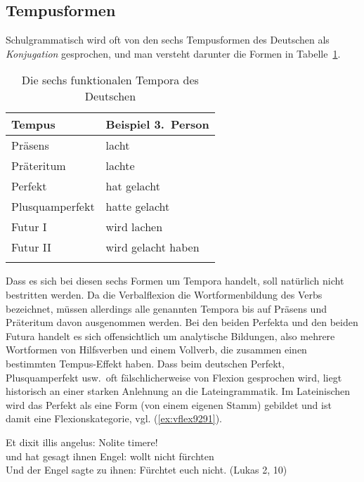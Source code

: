 \subsection{Tempusformen}

\label{sec:deutemp}

Schulgrammatisch wird oft von den sechs Tempusformen des Deutschen als \textit{Konjugation} gesprochen, und man versteht darunter \idR die Formen in Tabelle~\ref{tab:sechstempora}.

\begin{table}
  \centering
  \begin{tabular}{ll}
    \lsptoprule
    \textbf{Tempus} & \textbf{Beispiel 3.~Person}\\
    \midrule
    Präsens & lacht \\
    Präteritum & lachte \\
    Perfekt & hat gelacht \\
    Plusquamperfekt & hatte gelacht \\
    Futur I & wird lachen \\
    Futur II & wird gelacht haben \\
    \lspbottomrule
  \end{tabular}
  \caption{Die sechs funktionalen Tempora des Deutschen}
  \label{tab:sechstempora}
\end{table}

Dass es sich bei diesen sechs Formen um Tempora handelt, soll natürlich nicht bestritten werden.
Da die Verbalflexion die Wortformenbildung des Verbs bezeichnet, müssen allerdings alle genannten Tempora bis auf Präsens und Präteritum davon ausgenommen werden.
Bei den beiden Perfekta und den beiden Futura handelt es sich offensichtlich um analytische Bildungen, also mehrere Wortformen von Hilfsverben und einem Vollverb, die zusammen einen bestimmten Tempus-Effekt haben.
Dass beim deutschen Perfekt, Plusquamperfekt usw.\ oft fälschlicherweise von Flexion gesprochen wird, liegt historisch an einer starken Anlehnung an die Lateingrammatik.
Im Lateinischen wird \zB das Perfekt als eine Form (von einem eigenen Stamm) gebildet und ist damit eine Flexionskategorie, vgl. (\ref{ex:vflex9291}).

\begin{exe}
  \ex\label{ex:vflex9291}\gll Et dixit illis angelus: Nolite timere!\\
  und {hat gesagt} ihnen {Engel}: {wollt nicht} fürchten\\
  \glt Und der Engel sagte zu ihnen: Fürchtet euch nicht. (Lukas 2, 10)
\end{exe}

